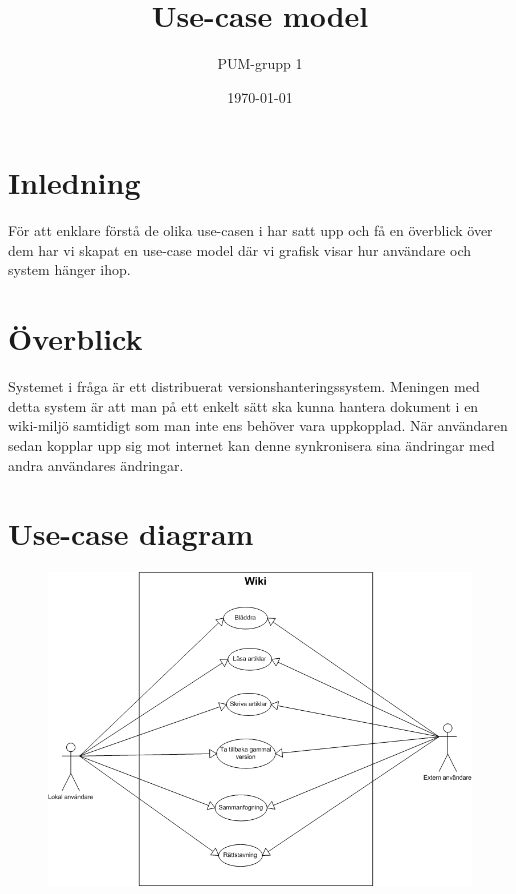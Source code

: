 

\ifpdf
\else
\fi

\title{Use-case model}
\author{PUM-grupp 1}
\date{\today}



\maketitle\thispagestyle{empty}

\newpage

\section{Inledning}
För att enklare förstå de olika use-casen i har satt upp och få en överblick över dem har vi skapat en use-case model där vi grafisk visar hur användare och system hänger ihop.
\section{Överblick}
Systemet i fråga är ett distribuerat versionshanteringssystem. Meningen med detta system är att man på ett enkelt sätt ska kunna hantera dokument i en wiki-miljö samtidigt som man inte ens behöver vara uppkopplad. När användaren sedan kopplar upp sig mot internet kan denne synkronisera sina ändringar med andra användares ändringar.
\section{Use-case diagram}
 \begin{figure}[H] %
  \centering
  \includegraphics[scale=0.50]{Use-case-diagram.png}
\end{figure}
